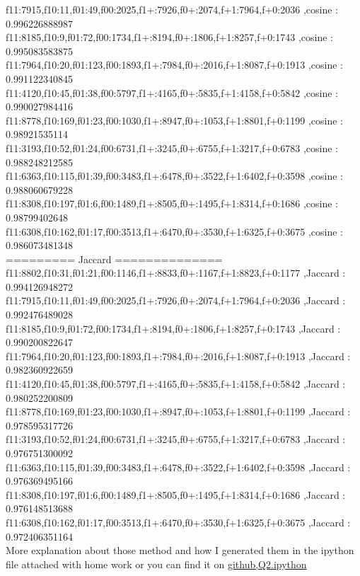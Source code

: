 \documentclass{article}
\begin{document}
f11:7915,f10:11,f01:49,f00:2025,f1+:7926,f0+:2074,f+1:7964,f+0:2036 ,cosine : 0.996226888987\\
f11:8185,f10:9,f01:72,f00:1734,f1+:8194,f0+:1806,f+1:8257,f+0:1743 ,cosine : 0.995083583875\\
f11:7964,f10:20,f01:123,f00:1893,f1+:7984,f0+:2016,f+1:8087,f+0:1913 ,cosine : 0.991122340845\\
f11:4120,f10:45,f01:38,f00:5797,f1+:4165,f0+:5835,f+1:4158,f+0:5842 ,cosine : 0.990027984416\\
f11:8778,f10:169,f01:23,f00:1030,f1+:8947,f0+:1053,f+1:8801,f+0:1199 ,cosine : 0.98921535114\\
f11:3193,f10:52,f01:24,f00:6731,f1+:3245,f0+:6755,f+1:3217,f+0:6783 ,cosine : 0.988248212585\\
f11:6363,f10:115,f01:39,f00:3483,f1+:6478,f0+:3522,f+1:6402,f+0:3598 ,cosine : 0.988060679228\\
f11:8308,f10:197,f01:6,f00:1489,f1+:8505,f0+:1495,f+1:8314,f+0:1686 ,cosine : 0.98799402648\\
f11:6308,f10:162,f01:17,f00:3513,f1+:6470,f0+:3530,f+1:6325,f+0:3675 ,cosine : 0.986073481348\\
========= Jaccard ==============\\
f11:8802,f10:31,f01:21,f00:1146,f1+:8833,f0+:1167,f+1:8823,f+0:1177 ,Jaccard : 0.994126948272\\
f11:7915,f10:11,f01:49,f00:2025,f1+:7926,f0+:2074,f+1:7964,f+0:2036 ,Jaccard : 0.992476489028\\
f11:8185,f10:9,f01:72,f00:1734,f1+:8194,f0+:1806,f+1:8257,f+0:1743 ,Jaccard : 0.990200822647\\
f11:7964,f10:20,f01:123,f00:1893,f1+:7984,f0+:2016,f+1:8087,f+0:1913 ,Jaccard : 0.982360922659\\
f11:4120,f10:45,f01:38,f00:5797,f1+:4165,f0+:5835,f+1:4158,f+0:5842 ,Jaccard : 0.980252200809\\
f11:8778,f10:169,f01:23,f00:1030,f1+:8947,f0+:1053,f+1:8801,f+0:1199 ,Jaccard : 0.978595317726\\
f11:3193,f10:52,f01:24,f00:6731,f1+:3245,f0+:6755,f+1:3217,f+0:6783 ,Jaccard : 0.976751300092\\
f11:6363,f10:115,f01:39,f00:3483,f1+:6478,f0+:3522,f+1:6402,f+0:3598 ,Jaccard : 0.976369495166\\
f11:8308,f10:197,f01:6,f00:1489,f1+:8505,f0+:1495,f+1:8314,f+0:1686 ,Jaccard : 0.976148513688\\
f11:6308,f10:162,f01:17,f00:3513,f1+:6470,f0+:3530,f+1:6325,f+0:3675 ,Jaccard : 0.972406351164\\
More explanation about those method and how I generated them in the ipython file attached with home work or you can find it on \href{https://github.com/aqeel13932/DM/tree/master/HW06}{github,Q2.ipython}
\end{document}
